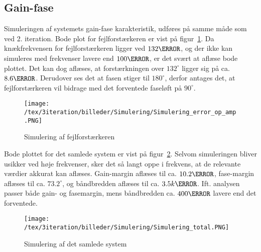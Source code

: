 
\subsection{Gain-fase}
Simuleringen af systemets gain-fase karakteristik, udføres på samme måde som ved 2. iteration. Bode plot for fejlforstærkeren er vist på figur~\ref{fig:Simulering_error_op_amp_3}. Da knækfrekvensen for fejlforstærkeren ligger ved $132\hertz$, og der ikke kan simuleres med frekvenser lavere end $100\hertz$, er det svært at aflæse bode plottet. Det kan dog aflæses, at forstærkningen over $132^\circ$ ligger sig på ca. $8.6\decibel$. Derudover ses det at fasen stiger til $180^\circ$, derfor antages det, at fejlforstærkeren vil bidrage med det forventede faseløft på $90^\circ$. 

\begin{figure}[H]
	\center
	\texttt{[image: /tex/3iteration/billeder/Simulering/Simulering\_error\_op\_amp.PNG]}
	\caption{Simulering af fejlforstærkeren}
	\label{fig:Simulering_error_op_amp_3}
\end{figure}

\noindent Bode plottet for det samlede system er vist på figur~\ref{fig:Simulering_total_3}. Selvom simuleringen bliver usikker ved høje frekvenser, sker det så langt oppe i frekvens, at de relevante værdier akkurat kan aflæses. Gain-margin aflæses til ca. $10.2\decibel$, fase-margin aflæses til ca. $73.2^\circ$, og båndbredden aflæses til ca. $3.5k\hertz$. Ift. analysen passer både gain- og fasemargin, mens båndbredden ca. $400\hertz$ lavere end det forventede. 

\begin{figure}[H]
	\center
	\texttt{[image: /tex/3iteration/billeder/Simulering/Simulering\_total.PNG]}
	\caption{Simulering af det samlede system}
	\label{fig:Simulering_total_3}
\end{figure}